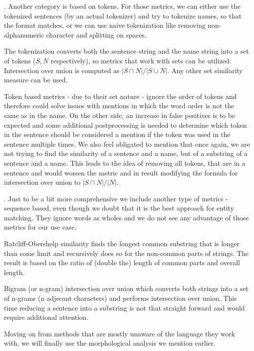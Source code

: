 . Another category is based on tokens. For those metrics, we can either use the tokenized sentences (by an actual tokenizer) and try to tokenize names, so that the format matches, or we can use naive tokenization like removing non-alphanumeric character and splitting on spaces.

The tokenization converts both the sentence string and the name string into a set of tokens ($S, N$ respectively), so metrics that work with sets can be utilized: Intersection over union is computed as $|S \cap N| / |S \cup N|$. Any other set similarity measure can be used. 

Token based metrics - due to their set nature - ignore the order of tokens and therefore could solve issues with mentions in which the word order is not the same as in the name. On the other side, an increase in false positives is to be expected and some additional postprocessing is needed to determine which token in the sentence should be considered a mention if the token was used in the sentence multiple times. We also feel obligated to mention that once again, we are not trying to find the similarity of a sentence and a name, but of a substring of a sentence and a name. This leads to the idea of removing all tokens, that are in a sentence and would worsen the metric and in result modifying the formula for intersection over union to  $|S \cap N| / |N|$.


. Just to be a bit more comprehensive we include another type of metrics - sequence based, even though we doubt that it is the best approach for entity matching. They ignore words as wholes and we do not see any advantage of those metrics for our use case. 

Ratcliff-Obershelp similarity finds the longest common substring that is longer than some limit and recursively does so for the non-common parts of strings. The result is based on the ratio of (double the) length of common parts and overall length. 

Bigram (or n-gram) intersection over union which converts both strings into a set of n-grams (n adjecant characters) and performs intersection over union. This time reducing a sentence into a substring is not that straight forward and would require additional attention.


Moving on from methods that are mostly unaware of the language they work with, we will finally use the morphological analysis we mention earlier.

